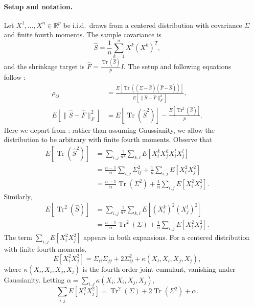 \documentclass[journal]{IEEEtran}
\begin{document}
\paragraph{Setup and notation.}
Let $X^1,\ldots,X^n\in\mathbb{R}^p$ be i.i.d.\ draws from a centered distribution with
covariance $\Sigma$ and finite fourth moments.
The sample covariance is
\begin{equation*}
\hat{S} = \frac{1}{n}\sum_{k=1}^n X^k(X^k)^T,
\end{equation*}
and the shrinkage target is $\hat{F}=\frac{\operatorname{Tr}(\hat{S})}{p}I$.
The setup and following equations follow \cite{OAS}:
\begin{align}
\rho_O &= \frac{E[\operatorname{Tr}((\Sigma-\hat{S})(\hat{F}-\hat{S}))]}{E[\lVert\hat{S}-\hat{F}\rVert_F^2]}, \label{eq:oracle}\\
E[\lVert\hat{S}-\hat{F}\rVert_F^2] &= E[\operatorname{Tr}(\hat{S}^2)] - \frac{E[\operatorname{Tr}^2(\hat{S})]}{p}. \label{eq:denom}
\end{align}
Here we depart from \cite{OAS}: rather than assuming Gaussianity, we allow the
distribution to be arbitrary with finite fourth moments.
Observe that
\begin{align}
E[\operatorname{Tr}(\hat{S}^2)]
&= \sum_{i,j}\frac{1}{n^2}\sum_{k,l} E[X_i^k X_j^k X_i^l X_j^l] \nonumber\\
&= \frac{n-1}{n}\sum_{i,j}\Sigma_{ij}^2
   + \frac{1}{n}\sum_{i,j}E[X_i^2 X_j^2] \nonumber\\
&= \frac{n-1}{n}\operatorname{Tr}(\Sigma^2)
   + \frac{1}{n}\sum_{i,j}E[X_i^2 X_j^2]. \label{eq:trS2expand}
\end{align}
Similarly,
\begin{align}
E[\operatorname{Tr}^2(\hat{S})]
&= \sum_{i,j}\frac{1}{n^2}\sum_{k,l}E[(X_i^k)^2(X_j^l)^2] \nonumber\\
&= \frac{n-1}{n}\operatorname{Tr}^2(\Sigma)
   + \frac{1}{n}\sum_{i,j}E[X_i^2 X_j^2]. \label{eq:tr2Sexpand}
\end{align}
The term $\sum_{i,j}E[X_i^2 X_j^2]$ appears in both expansions.
For a centered distribution with finite fourth moments,
\begin{equation}
E[X_i^2 X_j^2] = \Sigma_{ii}\Sigma_{jj} + 2\Sigma_{ij}^2
  + \kappa(X_i,X_i,X_j,X_j), \label{eq:fourthmoment}
\end{equation}
where $\kappa(X_i,X_i,X_j,X_j)$ is the fourth-order joint cumulant, vanishing under
Gaussianity. Letting $\alpha=\sum_{i,j}\kappa(X_i,X_i,X_j,X_j)$,
\begin{equation}
\sum_{i,j}E[X_i^2 X_j^2]
  = \operatorname{Tr}^2(\Sigma)+2\operatorname{Tr}(\Sigma^2)+\alpha. \label{eq:sumfourth}
\end{equation}
\end{document}
